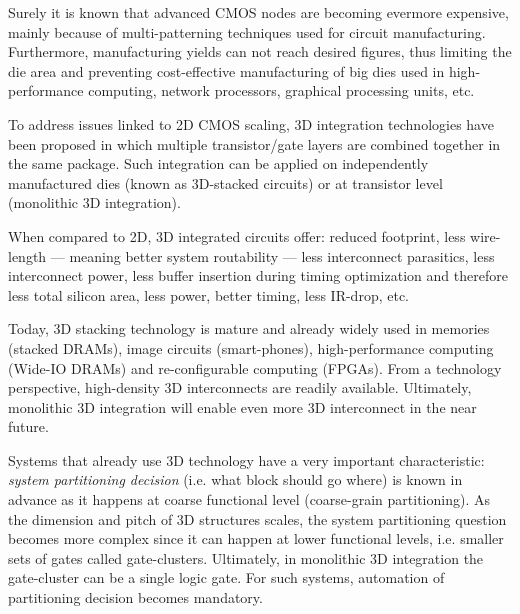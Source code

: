 \documentclass[conference]{IEEEtran}
\begin{document}
Surely it is known that advanced CMOS nodes are becoming evermore expensive, mainly because of multi-patterning techniques used for circuit manufacturing. Furthermore, manufacturing yields can not reach desired figures, thus limiting the die area and preventing cost-effective manufacturing of big dies used in high-performance computing, network processors, graphical processing units, etc. 

To address issues linked to 2D CMOS scaling, 3D integration technologies have been proposed in which multiple transistor/gate layers are combined together in the same package. Such integration can be applied on independently manufactured dies (known as 3D-stacked circuits) or at transistor level (monolithic 3D integration).

When compared to 2D, 3D integrated circuits offer: reduced footprint, less wire-length --- meaning better system routability --- less interconnect parasitics, less interconnect power, less buffer insertion during timing optimization and therefore less total silicon area, less power, better timing, less IR-drop, etc. 


Today, 3D stacking technology is mature and already widely used in memories (stacked DRAMs), image circuits (smart-phones), high-performance computing (Wide-IO DRAMs) and re-configurable computing (FPGAs). From a technology perspective, high-density 3D interconnects are readily available. Ultimately, monolithic 3D integration will enable even more 3D interconnect in the near future.

Systems that already use 3D technology have a very important characteristic: \textit{system partitioning decision} (i.e. what block should go where) is known in advance as it happens at coarse functional level (coarse-grain partitioning). As the dimension and pitch of 3D structures scales, the system partitioning question becomes more complex since it can happen at lower functional levels, i.e. smaller sets of gates called gate-clusters. Ultimately, in monolithic 3D integration the gate-cluster can be a single logic gate. For such systems, automation of partitioning decision becomes mandatory. 
\end{document}
